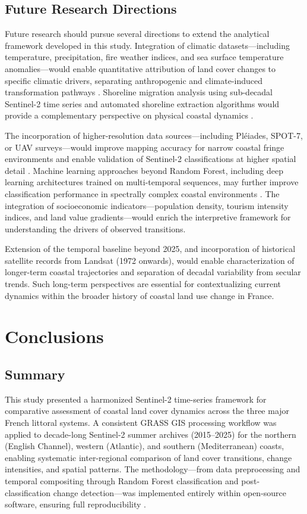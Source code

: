 \documentclass[remotesensing,article,submit,pdftex,moreauthors]{Definitions/mdpi}
\begin{document}
\subsection{Future Research Directions}

Future research should pursue several directions to extend the analytical framework developed in this study. Integration of climatic datasets—including temperature, precipitation, fire weather indices, and sea surface temperature anomalies—would enable quantitative attribution of land cover changes to specific climatic drivers, separating anthropogenic and climate-induced transformation pathways \citep{IPCC2022med, LeCozannet2024}. Shoreline migration analysis using sub-decadal Sentinel-2 time series and automated shoreline extraction algorithms would provide a complementary perspective on physical coastal dynamics \citep{Review2025, Graffin2024}.

The incorporation of higher-resolution data sources—including Pléiades, SPOT-7, or UAV surveys—would improve mapping accuracy for narrow coastal fringe environments and enable validation of Sentinel-2 classifications at higher spatial detail \citep{BGDAG2024}. Machine learning approaches beyond Random Forest, including deep learning architectures trained on multi-temporal sequences, may further improve classification performance in spectrally complex coastal environments \citep{w16081141}. The integration of socioeconomic indicators—population density, tourism intensity indices, and land value gradients—would enrich the interpretive framework for understanding the drivers of observed transitions.

Extension of the temporal baseline beyond 2025, and incorporation of historical satellite records from Landsat (1972 onwards), would enable characterization of longer-term coastal trajectories and separation of decadal variability from secular trends. Such long-term perspectives are essential for contextualizing current dynamics within the broader history of coastal land use change in France.

\section{Conclusions}

\subsection{Summary}

This study presented a harmonized Sentinel-2 time-series framework for comparative assessment of coastal land cover dynamics across the three major French littoral systems. A consistent GRASS GIS processing workflow was applied to decade-long Sentinel-2 summer archives (2015--2025) for the northern (English Channel), western (Atlantic), and southern (Mediterranean) coasts, enabling systematic inter-regional comparison of land cover transitions, change intensities, and spatial patterns. The methodology—from data preprocessing and temporal compositing through Random Forest classification and post-classification change detection—was implemented entirely within open-source software, ensuring full reproducibility \citep{Neteler2012, Lemenkova2023GRASS, Gatis2022}.
\end{document}
